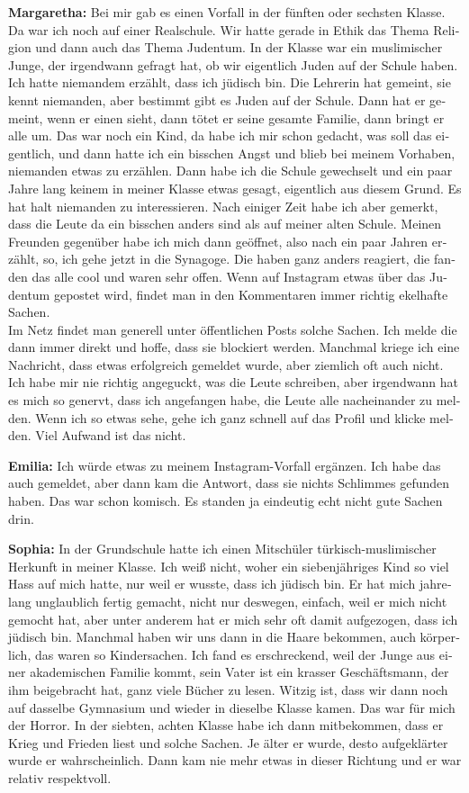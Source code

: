 \begin{otherlanguage}{ngerman}
\textbf{Margaretha:} Bei mir gab es einen Vorfall in der fünften oder sechsten Klasse. Da war ich noch auf einer Realschule. Wir hatte gerade in Ethik das Thema Religion und dann auch das Thema Judentum. In der Klasse war ein muslimischer Junge, der irgendwann gefragt hat, ob wir eigentlich Juden auf der Schule haben. Ich hatte niemandem erzählt, dass ich jüdisch bin. Die Lehrerin hat gemeint, sie kennt niemanden, aber bestimmt gibt es Juden auf der Schule. Dann hat er gemeint, wenn er einen sieht, dann tötet er seine gesamte Familie, dann bringt er alle um. Das war noch ein Kind, da habe ich mir schon gedacht, was soll das eigentlich, und dann hatte ich ein bisschen Angst und blieb bei meinem Vorhaben, niemanden etwas zu erzählen. Dann habe ich die Schule gewechselt und ein paar Jahre lang keinem in meiner Klasse etwas gesagt, eigentlich aus diesem Grund. Es hat halt niemanden zu interessieren. Nach einiger Zeit habe ich aber gemerkt, dass die Leute da ein bisschen anders sind als auf meiner alten Schule. Meinen Freunden gegenüber habe ich mich dann geöffnet, also nach ein paar Jahren erzählt, so, ich gehe jetzt in die Synagoge. Die haben ganz anders reagiert, die fanden das alle cool und waren sehr offen. Wenn auf Instagram etwas über das Judentum gepostet wird, findet man in den Kommentaren immer richtig ekelhafte Sachen.\\ 
Im Netz findet man generell unter öffentlichen Posts solche Sachen. Ich melde die dann immer direkt und hoffe, dass sie blockiert werden. Manchmal kriege ich eine Nachricht, dass etwas erfolgreich gemeldet wurde, aber ziemlich oft auch nicht. Ich habe mir nie richtig angeguckt, was die Leute schreiben, aber irgendwann hat es mich so genervt, dass ich angefangen habe, die Leute alle nacheinander zu melden. Wenn ich so etwas sehe, gehe ich ganz schnell auf das Profil und klicke melden. Viel Aufwand ist das nicht.  

\textbf{Emilia:} Ich würde etwas zu meinem Instagram-Vorfall ergänzen. Ich habe das auch gemeldet, aber dann kam die Antwort, dass sie nichts Schlimmes gefunden haben. Das war schon komisch. Es standen ja eindeutig echt nicht gute Sachen drin.  

\textbf{Sophia:} In der Grundschule hatte ich einen Mitschüler türkisch-muslimischer Herkunft in meiner Klasse. Ich weiß nicht, woher ein siebenjähriges Kind so viel Hass auf mich hatte, nur weil er wusste, dass ich jüdisch bin. Er hat mich jahrelang unglaublich fertig gemacht, nicht nur deswegen, einfach, weil er mich nicht gemocht hat, aber unter anderem hat er mich sehr oft damit aufgezogen, dass ich jüdisch bin. Manchmal haben wir uns dann in die Haare bekommen, auch körperlich, das waren so Kindersachen. Ich fand es erschreckend, weil der Junge aus einer akademischen Familie kommt, sein Vater ist ein krasser Geschäftsmann, der ihm beigebracht hat, ganz viele Bücher zu lesen. Witzig ist, dass wir dann noch auf dasselbe Gymnasium und wieder in dieselbe Klasse kamen. Das war für mich der Horror. In der siebten, achten Klasse habe ich dann mitbekommen, dass er Krieg und Frieden liest und solche Sachen. Je älter er wurde, desto aufgeklärter wurde er wahrscheinlich. Dann kam nie mehr etwas in dieser Richtung und er war relativ respektvoll.  


\end{otherlanguage}
